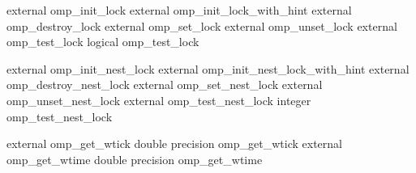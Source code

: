 {\begin{codepar}
     external omp\_init\_lock
     external omp\_init\_lock\_with\_hint
     external omp\_destroy\_lock
     external omp\_set\_lock
     external omp\_unset\_lock
     external omp\_test\_lock
     logical omp\_test\_lock

     external omp\_init\_nest\_lock
     external omp\_init\_nest\_lock\_with\_hint
     external omp\_destroy\_nest\_lock
     external omp\_set\_nest\_lock
     external omp\_unset\_nest\_lock
     external omp\_test\_nest\_lock
     integer omp\_test\_nest\_lock

     external omp\_get\_wtick
     double precision omp\_get\_wtick
     external omp\_get\_wtime
     double precision omp\_get\_wtime
\end{codepar}}





\pagebreak
